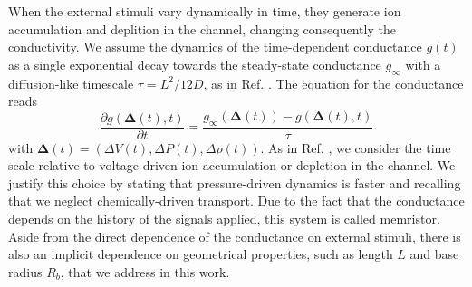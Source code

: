 \documentclass[reprint,superscriptaddress,prb,showkeys]{revtex4-2}
\newcommand{\brac}[1]{\left(#1 \right)} %
\begin{document}

When the external stimuli vary dynamically in time, they generate ion accumulation and deplition in the channel, changing consequently the conductivity. We assume the dynamics of the time-dependent conductance $g(t)$ as a single exponential decay towards the steady-state conductance $g_{\infty}$ with a diffusion-like timescale $\tau = L^2/12D$, as in Ref. \cite{Rene_IonicNeuromorphic}. The equation for the conductance reads
\begin{equation}
\frac{\partial g\brac{\boldsymbol{\Delta}(t), t}}{\partial t} = \frac{g_{\infty}\brac{\boldsymbol{\Delta}(t)}-g\brac{\boldsymbol{\Delta}(t), t}}{\tau}
\label{eq:eqofmotconductance}
\end{equation}
with $\boldsymbol{\Delta}(t) = \brac{\Delta V\brac{t},\Delta P\brac{t}, \Delta \rho\brac{t}}$.
As in Ref. \cite{Rene_IonicNeuromorphic}, we consider the time scale relative to voltage-driven ion accumulation or depletion in the channel. We justify this choice by stating that pressure-driven dynamics is faster and recalling that we neglect chemically-driven transport. Due to the fact that the conductance depends on the history of the signals applied, this system is called memristor. Aside from the direct dependence of the conductance on external stimuli, there is also an implicit dependence on geometrical properties, such as length $L$ and base radius $R_b$, that we address in this work.
\end{document}

